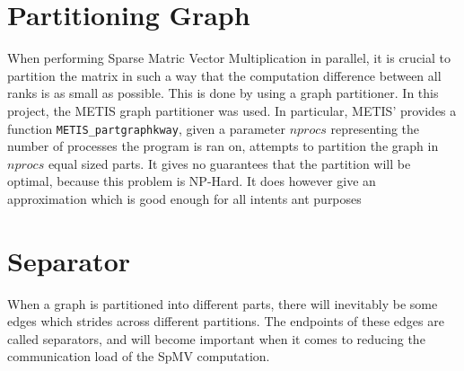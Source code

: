 \section{Partitioning Graph}
When performing Sparse Matric Vector Multiplication in parallel, it is crucial to partition the matrix in such a way that the computation difference between all ranks is as small as possible. This is done by using a graph partitioner. In this project, the METIS graph partitioner was used. In particular, METIS' provides a function \texttt{METIS\_partgraphkway}, given a parameter \(nprocs\) representing the number of processes the program is ran on, attempts to partition the graph in \(nprocs\) equal sized parts. It gives no guarantees that the partition will be optimal, because this problem is NP-Hard. It does however give an approximation which is good enough for all intents ant purposes 

\section{Separator}
When a graph is partitioned into different parts, there will inevitably be some edges which strides across different partitions. The endpoints of these edges are called separators, and will become important when it comes to reducing the communication load of the SpMV computation.

